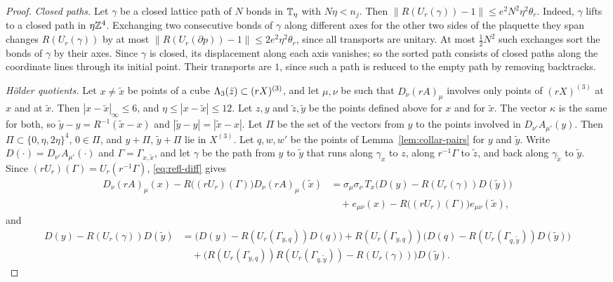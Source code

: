 \begin{proof}
\emph{Closed paths.} Let $\gamma$ be a closed lattice path of $N$ bonds in $\mathbb T_\eta$ with $N\eta<n_j$. Then $\|R(U_r(\gamma))-1\|\le e^2N^2\eta^2\theta_r$. Indeed, $\gamma$ lifts to a closed path in $\eta\mathbb Z^4$. Exchanging two consecutive bonds of $\gamma$ along different axes for the other two sides of the plaquette they span changes $R(U_r(\gamma))$ by at most $\|R(U_r(\partial p))-1\|\le2e^2\eta^2\theta_r$, since all transports are unitary. At most $\frac12N^2$ such exchanges sort the bonds of $\gamma$ by their axes. Since $\gamma$ is closed, its displacement along each axis vanishes; so the sorted path consists of closed paths along the coordinate lines through its initial point. Their transports are $1$, since such a path is reduced to the empty path by removing backtracks.

\emph{H\"older quotients.} Let $x\ne\tilde x$ be points of a cube $\Lambda_3(\bar z)\subset(rX)^{(3)}$, and let $\mu,\nu$ be such that $D_\nu(rA)_\mu$ involves only points of $(rX)^{(3)}$ at $x$ and at $\tilde x$. Then $|x-\tilde x|_\infty\le6$, and $\eta\le|x-\tilde x|\le12$. Let $z,y$ and $\tilde z,\tilde y$ be the points defined above for $x$ and for $\tilde x$. The vector $\kappa$ is the same for both, so $\tilde y-y=R^{-1}(\tilde x-x)$ and $|\tilde y-y|=|\tilde x-x|$. Let $\Pi$ be the set of the vectors from $y$ to the points involved in $D_{\nu'}A_{\mu'}(y)$. Then $\Pi\subset\{0,\eta,2\eta\}^4$, $0\in\Pi$, and $y+\Pi$, $\tilde y+\Pi$ lie in $X^{(3)}$. Let $q,w,w'$ be the points of Lemma~\ref{lem:collar-pairs} for $y$ and $\tilde y$. Write $D(\cdot)=D_{\nu'}A_{\mu'}(\cdot)$ and $\Gamma=\Gamma_{x,\tilde x}$, and let $\gamma$ be the path from $y$ to $\tilde y$ that runs along $\gamma_x$ to $z$, along $r^{-1}\Gamma$ to $\tilde z$, and back along $\gamma_{\tilde x}$ to $\tilde y$. Since $(rU_r)(\Gamma)=U_r(r^{-1}\Gamma)$, \eqref{eq:refl-diff} gives
\[
\begin{aligned}
D_\nu(rA)_\mu(x)-R\big((rU_r)(\Gamma)\big)D_\nu(rA)_\mu(\tilde x)&=\sigma_\mu\sigma_\nu\,T_x\big(D(y)-R(U_r(\gamma))D(\tilde y)\big)\\
&\quad+e_{\mu\nu}(x)-R\big((rU_r)(\Gamma)\big)e_{\mu\nu}(\tilde x),
\end{aligned}
\]
and
\[
\begin{aligned}
D(y)-R(U_r(\gamma))D(\tilde y)&=\big(D(y)-R(U_r(\Gamma_{y,q}))D(q)\big)+R(U_r(\Gamma_{y,q}))\big(D(q)-R(U_r(\Gamma_{q,\tilde y}))D(\tilde y)\big)\\
&\quad+\big(R(U_r(\Gamma_{y,q}))R(U_r(\Gamma_{q,\tilde y}))-R(U_r(\gamma))\big)D(\tilde y).
\end{aligned}
\]
\end{proof}
